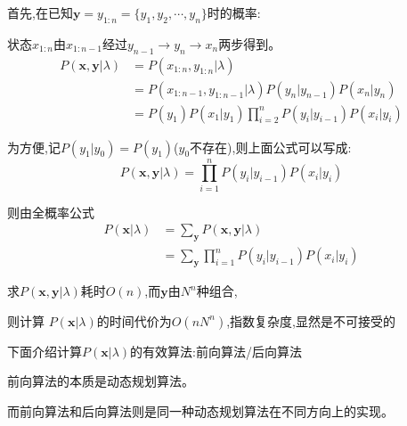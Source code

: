 \documentclass[UTF8,a4paper]{ctexart}%
\begin{document}
            首先,在已知$\bm{y} = y_{1:n} = \{y_1, y_2 , \cdots , y_n \}$时的概率:

            {\color{blue}
              状态$x_{1:n}$由$x_{1:n-1}$经过$y_{n-1}\to y_{n} \to x_{n}$两步得到。
            }
            \begin{equation}\begin{split}
              P(\bm{x,y}|\lambda) &= P(x_{1:n},y_{1:n} | \lambda)\\
              &= P(x_{1:n-1},y_{1:n-1} | \lambda)P(y_{n}|y_{n-1})P(x_n|y_{n})\\
              &= P(y_1)P(x_1|y_1)\prod_{i = 2}^n P(y_{i}|y_{i-1})P(x_i|y_{i})
            \end{split}\end{equation}

            为方便,记$P(y_1|y_0) = P(y_1)$($y_0$不存在),则上面公式可以写成:
            \begin{equation}
              P(\bm{x,y}|\lambda) = \prod_{i = 1}^n P(y_{i}|y_{i-1})P(x_i|y_{i})
            \end{equation}

            则由全概率公式
            \begin{equation}\begin{split}
                P(\bm{x}|\lambda) &= \sum_{\bm{y}}P(\bm{x,y}|\lambda) \\
                &= \sum_{\bm{y}} \prod_{i = 1}^n P(y_{i}|y_{i-1})P(x_i|y_{i})
            \end{split}\end{equation}

            求$P(\bm{x,y}|\lambda)$耗时$O(n)$,而$\bm{y}$由$N^n$种组合,

            则计算 $P(\bm{x}|\lambda)$的时间代价为{\color{red}$O(nN^n)$},指数复杂度,显然是不可接受的

            下面介绍计算$P(\bm{x}|\lambda)$的有效算法:前向算法/后向算法

            {\color{blue}
                前向算法的本质是动态规划算法。

                而前向算法和后向算法则是同一种动态规划算法在不同方向上的实现。
            }
\end{document}
